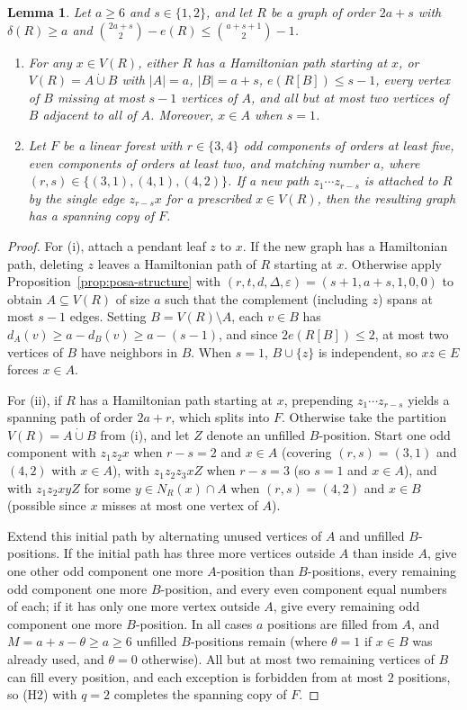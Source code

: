 \documentclass[10pt]{article}
\theoremstyle{compactplain}
\newtheorem{lemma}[theorem]{Lemma}
\theoremstyle{remark}\newtheorem{remark}[theorem]{Remark}
\begin{document}
\begin{lemma}\label{lem:rooted-completion}
Let $a\ge6$ and $s\in\{1,2\}$, and let $R$ be a graph of order $2a+s$
with $\delta(R)\ge a$ and
$\binom{2a+s}{2}-e(R)\le\binom{a+s+1}{2}-1$.
\begin{enumerate}
\item[(i)] For any $x\in V(R)$, either $R$ has a Hamiltonian path
starting at $x$, or $V(R)=A\dot\cup B$ with $|A|=a$, $|B|=a+s$,
$e(R[B])\le s-1$, every vertex of $B$ missing at most $s-1$ vertices of
$A$, and all but at most two vertices of $B$ adjacent to all of $A$.
Moreover, $x\in A$ when $s=1$.
\item[(ii)] Let $F$ be a linear forest with $r\in\{3,4\}$ odd components
of orders at least five, even components of orders at least two, and
matching number $a$, where $(r,s)\in\{(3,1),(4,1),(4,2)\}$. If a new
path $z_1\cdots z_{r-s}$ is attached to $R$ by the single edge
$z_{r-s}x$ for a prescribed $x\in V(R)$, then the resulting graph has a
spanning copy of $F$.
\end{enumerate}
\end{lemma}
\begin{proof}
For (i), attach a pendant leaf $z$ to $x$. If the new graph has a
Hamiltonian path, deleting $z$ leaves a Hamiltonian path of $R$ starting
at $x$. Otherwise apply Proposition~\ref{prop:posa-structure} with
$(r,t,d,\Delta,\varepsilon)=(s+1,a+s,1,0,0)$ to obtain $A\subseteq V(R)$
of size $a$ such that the complement (including $z$) spans at most $s-1$
edges. Setting $B=V(R)\setminus A$, each $v\in B$ has
$d_A(v)\ge a-d_B(v)\ge a-(s-1)$, and since $2e(R[B])\le2$, at most two
vertices of $B$ have neighbors in $B$. When $s=1$, $B\cup\{z\}$ is
independent, so $xz\in E$ forces $x\in A$.

For (ii), if $R$ has a Hamiltonian path starting at $x$, prepending
$z_1\cdots z_{r-s}$ yields a spanning path of order $2a+r$, which splits
into $F$. Otherwise take the partition $V(R)=A\dot\cup B$ from (i), and
let $Z$ denote an unfilled $B$-position. Start one odd component with
$z_1z_2x$ when $r-s=2$ and $x\in A$ (covering $(r,s)=(3,1)$ and
$(4,2)$ with $x\in A$), with $z_1z_2z_3xZ$ when $r-s=3$ (so $s=1$ and
$x\in A$), and with $z_1z_2xyZ$ for some $y\in N_R(x)\cap A$ when
$(r,s)=(4,2)$ and $x\in B$ (possible since $x$ misses at most one vertex
of $A$).

Extend this initial path by alternating unused vertices of $A$ and
unfilled $B$-positions. If the initial path has three more vertices
outside $A$ than inside $A$, give one other odd component one more
$A$-position than $B$-positions, every remaining odd component one more
$B$-position, and every even component equal numbers of each; if it has
only one more vertex outside $A$, give every remaining odd component one
more $B$-position. In all cases $a$ positions are filled from $A$, and
$M=a+s-\theta\ge a\ge6$ unfilled $B$-positions remain (where $\theta=1$
if $x\in B$ was already used, and $\theta=0$ otherwise). All but at most
two remaining vertices of $B$ can fill every position, and each
exception is forbidden from at most $2$ positions, so (H2) with $q=2$
completes the spanning copy of $F$.
\end{proof}
\end{document}
